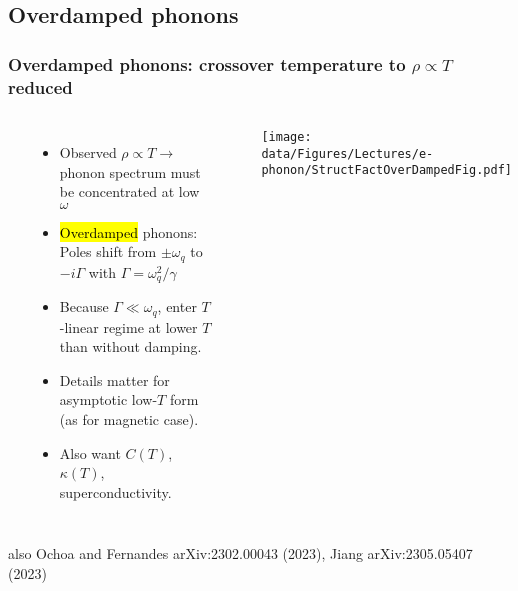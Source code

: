 \subsection{Overdamped phonons}
\begin{frame}[label=T1Origin]
    \frametitle{Overdamped phonons: crossover temperature to $\rho \propto  T$ reduced}
    
    \begin{columns}[t]
    \centerline{~}
    \vspace{-1.5em}
 
    \begin{itemize}
        \setlength\itemsep{0.5em}
    \item
    Observed $\rho \propto T \rightarrow$ \\
    phonon spectrum must be concentrated at low $\omega$
    \item \hl{Overdamped} phonons: 
    Poles shift from $\pm\omega_q$ to $-i\Gamma$ with $\Gamma=\omega_q^2/\gamma$
    \item
    Because $\Gamma \ll \omega_q$, enter $T$-linear regime at lower $T$ than without damping.
    \item Details matter for asymp\-totic low-$T$ form (as for magnetic case).
    \item Also want $C(T)$, $\kappa(T)$, superconductivity.
    \end{itemize}
    
    
    \centerline{~}
    \centerline{\texttt{[image: \\data/Figures/Lectures/e-phonon/StructFactOverDampedFig.pdf]}}
    
    \end{columns}
    \vspace*{\fill}
    \centerline{\makebox[\linewidth]{\rule{0.85\textwidth}{0.4pt}}}
    \centerline{\scriptsize also Ochoa and Fernandes arXiv:2302.00043 (2023), Jiang arXiv:2305.05407 (2023)}
\end{frame}
    
    




